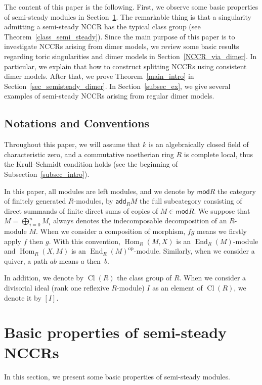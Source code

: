 \documentclass[11pt]{amsart}
\theoremstyle{definition}
\DeclareMathOperator{\op}{op}
\DeclareMathOperator{\Hom}{Hom}
\DeclareMathOperator{\Cl}{Cl}
\DeclareMathOperator{\End}{End}
\newcommand{\add}{\mathsf{add}}
\newcommand{\mc}{\mathsf{mod}}
\begin{document}
The content of this paper is the following. First, we observe some basic properties of semi-steady modules in Section~\ref{sec_semisteady}. The remarkable thing is that a singularity admitting a semi-steady NCCR has the typical class group (see Theorem~\ref{class_semi_steady}). Since the main purpose of this paper is to investigate NCCRs arising from dimer models, we review some basic results regarding toric singularities and dimer models in Section~\ref{NCCR_via_dimer}. In particular, we explain that how to construct splitting NCCRs using consistent dimer models. After that, we prove Theorem~\ref{main_intro} in Section~\ref{sec_semisteady_dimer}. In Section~\ref{subsec_ex}, we give several examples of semi-steady NCCRs arising from regular dimer models.

\subsection*{Notations and Conventions}

Throughout this paper, we will assume that $k$ is an algebraically closed field of characteristic zero, and a commutative noetherian ring $R$ is complete local, thus the Krull--Schmidt condition holds (see the beginning of Subsection~\ref{subsec_intro}).

In this paper, all modules are left modules, and we denote by $\mc R$ the category of finitely generated $R$-modules, by $\add_RM$ the full subcategory consisting of direct summands of finite direct sums of copies of $M\in \mc R$. We suppose that $M=\bigoplus^n_{i=0}M_i$ always denotes the indecomposable decomposition of an $R$-module $M$. When we consider a composition of morphism, $fg$ means we firstly apply $f$ then $g$. With this convention, $\Hom_R(M, X)$ is an $\End_R(M)$-module and $\Hom_R(X, M)$ is an $\End_R(M)^{\op}$-module. Similarly, when we consider a quiver, a path $ab$ means $a$ then~$b$.

In addition, we denote by $\Cl(R)$ the class group of $R$. When we consider a divisorial ideal (rank one reflexive $R$-module) $I$ as an element of $\Cl(R)$, we denote it by $[I]$.


\section{Basic properties of semi-steady NCCRs}\label{sec_semisteady}

In this section, we present some basic properties of semi-steady modules.
\end{document}
